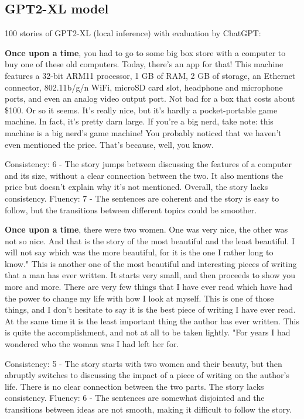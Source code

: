 \documentclass{article}
\begin{document}
\subsection{GPT2-XL model}

100 stories of GPT2-XL (local inference) with evaluation by ChatGPT:

\textbf{Once upon a time}, you had to go to some big box store with a computer to buy one of these old computers. Today, there's an app for that! This machine features a 32-bit ARM11 processor, 1 GB of RAM, 2 GB of storage, an Ethernet connector, 802.11b/g/n WiFi, microSD card slot, headphone and microphone ports, and even an analog video output port. Not bad for a box that costs about \$100. Or so it seems. It's really nice, but it's hardly a pocket-portable game machine. In fact, it's pretty darn large. If you're a big nerd, take note: this machine is a big nerd's game machine! You probably noticed that we haven't even mentioned the price. That's because, well, you know.

Consistency: 6 - The story jumps between discussing the features of a computer and its size, without a clear connection between the two. It also mentions the price but doesn't explain why it's not mentioned. Overall, the story lacks consistency.
Fluency: 7 - The sentences are coherent and the story is easy to follow, but the transitions between different topics could be smoother.

\textbf{Once upon a time}, there were two women. One was very nice, the other was not so nice. And that is the story of the most beautiful and the least beautiful. I will not say which was the more beautiful, for it is the one I rather long to know." This is another one of the most beautiful and interesting pieces of writing that a man has ever written. It starts very small, and then proceeds to show you more and more. There are very few things that I have ever read which have had the power to change my life with how I look at myself. This is one of those things, and I don't hesitate to say it is the best piece of writing I have ever read. At the same time it is the least important thing the author has ever written. This is quite the accomplishment, and not at all to be taken lightly. "For years I had wondered who the woman was I had left her for.

Consistency: 5 - The story starts with two women and their beauty, but then abruptly switches to discussing the impact of a piece of writing on the author's life. There is no clear connection between the two parts. The story lacks consistency.
Fluency: 6 - The sentences are somewhat disjointed and the transitions between ideas are not smooth, making it difficult to follow the story.
\end{document}
